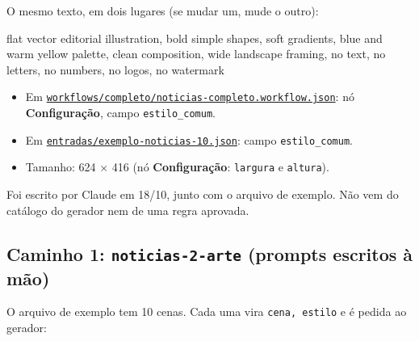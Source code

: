 O mesmo texto, em dois lugares (se mudar um, mude o outro):

\begin{sourcequote}
flat vector editorial illustration, bold simple shapes, soft gradients, blue and warm yellow palette, clean composition, wide landscape framing, no text, no letters, no numbers, no logos, no watermark

\end{sourcequote}

\begin{itemize}
\item 
Em \href{run:../../../workflows/completo/noticias-completo.workflow.json}{\nolinkurl{workflows/completo/noticias-completo.workflow.json}}: nó \textbf{Configuração}, campo \nolinkurl{estilo_comum}.


\item 
Em \href{run:../../../entradas/exemplo-noticias-10.json}{\nolinkurl{entradas/exemplo-noticias-10.json}}: campo \nolinkurl{estilo_comum}.


\item 
Tamanho: 624 × 416 (nó \textbf{Configuração}: \texttt{largura} e \texttt{altura}).


\end{itemize}

Foi escrito por Claude em 18/10, junto com o arquivo de exemplo. Não vem do catálogo do gerador nem de uma regra aprovada.

\subsection*{Caminho 1: \nolinkurl{noticias-2-arte} (prompts escritos à mão)}

O arquivo de exemplo tem 10 cenas. Cada uma vira \texttt{cena, estilo} e é pedida ao gerador:

